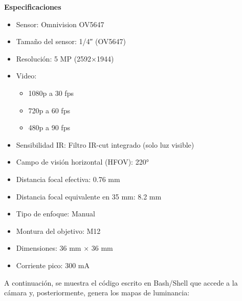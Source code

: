 \documentclass[
  letterpaper,
]{scrbook}
\providecommand{\tightlist}{%
  \setlength{\itemsep}{0pt}\setlength{\parskip}{0pt}}\usepackage{longtable,booktabs,array}
\begin{document}
\textbf{Especificaciones}

\begin{itemize}
\tightlist
\item
  Sensor: Omnivision OV5647
\item
  Tamaño del sensor: 1/4″ (OV5647)
\item
  Resolución: 5 MP (2592×1944)
\item
  Video:

  \begin{itemize}
  \tightlist
  \item
    1080p a 30 fps
  \item
    720p a 60 fps
  \item
    480p a 90 fps
  \end{itemize}
\item
  Sensibilidad IR: Filtro IR-cut integrado (solo luz visible)
\item
  Campo de visión horizontal (HFOV): 220°
\item
  Distancia focal efectiva: 0.76 mm
\item
  Distancia focal equivalente en 35 mm: 8.2 mm
\item
  Tipo de enfoque: Manual
\item
  Montura del objetivo: M12
\item
  Dimensiones: 36 mm × 36 mm
\item
  Corriente pico: 300 mA
\end{itemize}

A continuación, se muestra el código escrito en Bash/Shell que accede a
la cámara y, posteriormente, genera los mapas de luminancia:
\end{document}
